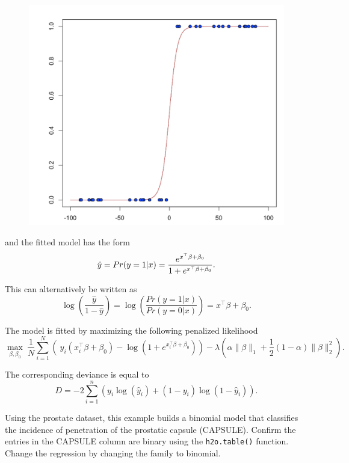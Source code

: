 \begin{figure}[h]
\centering
\includegraphics[scale=0.5]{images/scurve.png}
\end{figure}

and the fitted model has the form
$$ \hat{y} = Pr(y = 1|x) = {e^{x^{\top}\beta + \beta_0} \over 1 + e^{x^{\top} \beta + \beta_0} }.$$

This can alternatively be written as 
$$  \log \left( \frac{\hat{y}}{ 1- \hat{y} } \right)  = \log \left(  \frac{Pr(y=1|x)}{Pr(y=0|x)}   \right) = x^{\top} \beta + \beta_0.$$

The model is fitted by maximizing the following penalized likelihood 
$$  \max_{\beta,\beta_0} \  \frac{1}{N} \sum_{i=1}^{N} \left( \ y_i (x_i^{\top}\beta  + \beta_0) - \log (1 + e^{x_i^{\top}\beta  + \beta_0} ) \right)  - \lambda \left( \alpha \|\beta \|_1 +  \frac{1}{2}(1- \alpha)  \| \beta \|_2^2 \right). $$

The corresponding deviance is equal to 
$$D = -2\sum_{i=1}^{n} \left(y_i \log(\hat{y}_i) + (1 - y_i)\log(1-\hat{y}_i)  \right).$$

\waterExampleInR

Using the prostate dataset, this example builds a binomial model that classifies the incidence of penetration of the prostatic
capsule (CAPSULE). Confirm the entries in the CAPSULE column are binary using the \texttt{h2o.table()}
function. Change the regression by changing the family to binomial.

